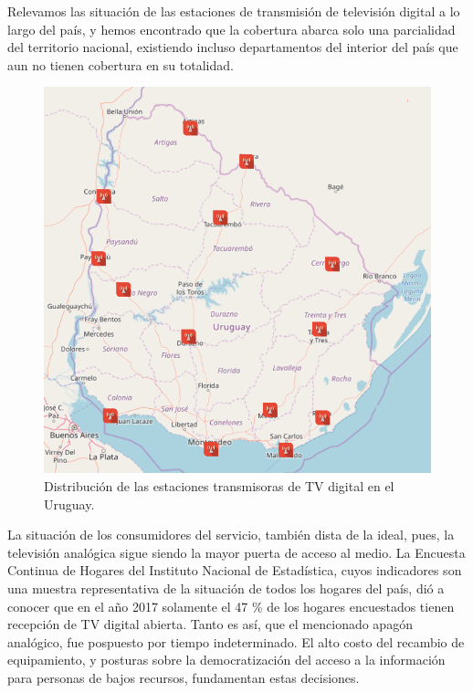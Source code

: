 Relevamos las situación de las estaciones de transmisión de televisión digital a lo largo del país, y hemos encontrado que la cobertura abarca solo una parcialidad del territorio nacional, existiendo incluso departamentos del interior del país que aun no tienen cobertura en su totalidad.

\begin{figure}
	\centering
	\includegraphics[scale=0.3]{figuras/cap01/mapa_estaciones}
	\caption{\label{mapa_estaciones} Distribución de las estaciones transmisoras de TV digital en el Uruguay.}
\end{figure}

La situación de los consumidores del servicio, también dista de la ideal, pues, la televisión analógica sigue siendo la mayor puerta de acceso al medio. La Encuesta Continua de Hogares del Instituto Nacional de Estadística\cite{ine2017}, cuyos indicadores son una muestra representativa de la situación de todos los hogares del país, dió a conocer que en el año 2017 solamente el 47 \% de los hogares encuestados tienen recepción de TV digital abierta. Tanto es así, que el mencionado apagón analógico, fue pospuesto por tiempo indeterminado. El alto costo del recambio de equipamiento, y posturas sobre la democratización del acceso a la información para personas de bajos recursos, fundamentan estas decisiones.

